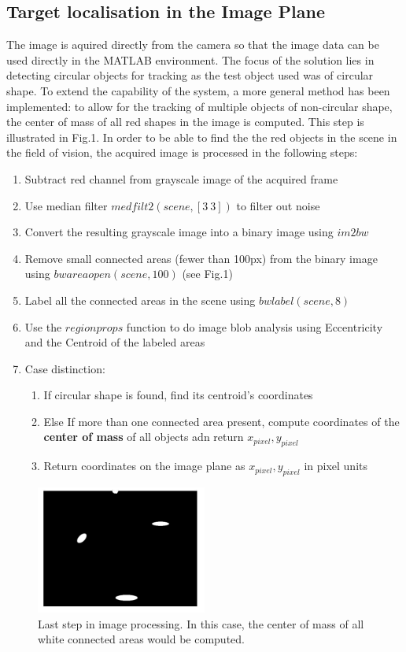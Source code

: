 \documentclass[letterpaper, 10 pt, conference]{ieeeconf}  %
\begin{document}
\subsection{Target localisation in the Image Plane}
The image is aquired directly from the camera so that the image data can be used directly in the MATLAB environment. The focus of the solution lies in detecting circular objects for tracking as the test object used was of circular shape. To extend the capability of the system, a more general method has been implemented: to allow for the tracking of multiple objects of non-circular shape, the center of mass of all red shapes in the image is computed. This step is illustrated in Fig.1. In order to be able to find the the red objects in the scene in the field of vision, the acquired image is processed in the following steps:
\begin{enumerate}
\item Subtract red channel from grayscale image of the acquired frame
\item Use median filter $medfilt2(scene,[3~3])$ to filter out noise
\item Convert the resulting grayscale image into a binary image using $im2bw$
\item Remove small connected areas (fewer than 100px) from the binary image using $bwareaopen(scene,100)$ (see Fig.1)
\item Label all the connected areas in the scene using $bwlabel(scene,8)$
\item Use the $regionprops$ function to do image blob analysis using Eccentricity and the Centroid of the labeled areas
\item Case distinction: 
{\setlength\itemindent{25pt} \begin{enumerate}\item{If circular shape is found, find its centroid's coordinates}\item{Else If more than one connected area present, compute coordinates of the \textbf{center of mass} of all objects adn return $x_{pixel},y_{pixel}$} \item{Return coordinates on the image plane as $x_{pixel},y_{pixel}$ in pixel units}\end{enumerate}} 
\end{enumerate}
\begin{figure}
\includegraphics[width=0.5\textwidth]{daniel_suksuk.jpg}
\caption*{\label{fig:center of mass}Last step in image processing. In this case, the center of mass of all white connected areas would be computed.}
\end{figure}
\end{document}
